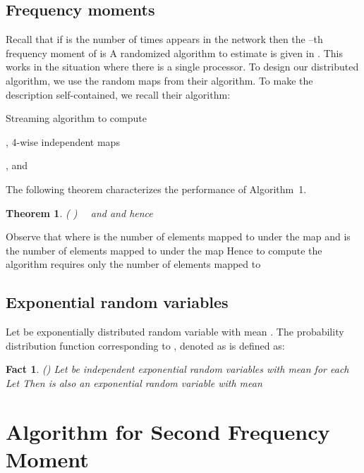 \documentclass[10pt,twosided,a4paper,draft,onecolumn]{article}
\newtheorem{theorem}{Theorem}
\newtheorem{Fact}{Fact}
\begin{document}
\subsection{Frequency moments}
\label{sec:prem_fk}

Recall that if  is the number of times  appears in the network
then the --th frequency moment of  is  A randomized algorithm to estimate  is given in
\cite{Alon96}. This works in the situation where there is a single
processor. To design our distributed algorithm, we use the random maps
from their algorithm. To make the description self-contained, we
recall their algorithm:
\begin{algorithm} 
  \caption{Streaming algorithm to compute }{\label{alg:f2_stream}} 
  \begin{algorithmic}[1]
    \REQUIRE ,  4-wise independent maps
      
    \STATE  ,  and  
    \STATE    
    \STATE   
  \end{algorithmic}
\end{algorithm}

The following theorem characterizes the performance of Algorithm~1.
\begin{theorem}
  \label{thm:ams-F2}
  (\cite[Theorem 2.2]{Alon96} )~~ and
   and hence

  
\end{theorem}


Observe that  where  is the number of elements mapped to  under the
map  and  is the number of elements mapped to 
under the map  Hence to compute  the algorithm
requires only the number of elements mapped to 

\subsection{Exponential random variables}
\label{sec:exp}

Let  be exponentially distributed random variable
with mean . The probability distribution function corresponding
to , denoted as  is defined as:

\begin{Fact} 
  \label{fact_exp}
  (\cite[Property 1]{Mosk-Aoyama06}) Let  be
  independent exponential random variables with mean  for each
   Let  Then
   is also an exponential random variable with mean
  
\end{Fact}


\section{Algorithm for Second Frequency Moment}
\label{sec:F2}
\end{document}
